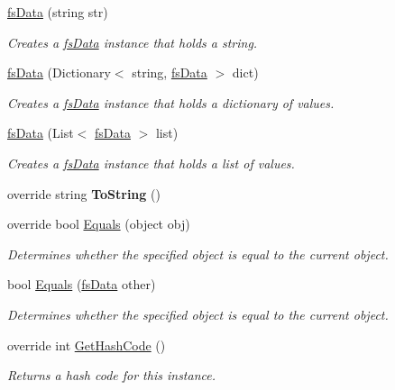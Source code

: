\begin{DoxyCompactItemize}
\hyperlink{class_full_serializer_1_1fs_data_a18d00eb27ffcbbd57ab7372856ae30f7}{fs\+Data} (string str)
\begin{DoxyCompactList}\small\item\em Creates a \hyperlink{class_full_serializer_1_1fs_data}{fs\+Data} instance that holds a string. \end{DoxyCompactList}\item 
\hyperlink{class_full_serializer_1_1fs_data_a8897bc4f6c2f0ff7acdcd0195746fc09}{fs\+Data} (Dictionary$<$ string, \hyperlink{class_full_serializer_1_1fs_data}{fs\+Data} $>$ dict)
\begin{DoxyCompactList}\small\item\em Creates a \hyperlink{class_full_serializer_1_1fs_data}{fs\+Data} instance that holds a dictionary of values. \end{DoxyCompactList}\item 
\hyperlink{class_full_serializer_1_1fs_data_af6e99c4d2e08a96957ccd44491026e92}{fs\+Data} (List$<$ \hyperlink{class_full_serializer_1_1fs_data}{fs\+Data} $>$ list)
\begin{DoxyCompactList}\small\item\em Creates a \hyperlink{class_full_serializer_1_1fs_data}{fs\+Data} instance that holds a list of values. \end{DoxyCompactList}\item 
\mbox{\label{class_full_serializer_1_1fs_data_ac64cd3d8fa914d376259ff913c208791}} 
override string {\bfseries To\+String} ()
\item 
override bool \hyperlink{class_full_serializer_1_1fs_data_a29d15c3ea23372768eea41226c322415}{Equals} (object obj)
\begin{DoxyCompactList}\small\item\em Determines whether the specified object is equal to the current object. \end{DoxyCompactList}\item 
bool \hyperlink{class_full_serializer_1_1fs_data_a31f0be7076e3aeea8051eef9b4bff6c3}{Equals} (\hyperlink{class_full_serializer_1_1fs_data}{fs\+Data} other)
\begin{DoxyCompactList}\small\item\em Determines whether the specified object is equal to the current object. \end{DoxyCompactList}\item 
override int \hyperlink{class_full_serializer_1_1fs_data_a915cae40a9014f6027c2b88e35d74e8c}{Get\+Hash\+Code} ()
\begin{DoxyCompactList}\small\item\em Returns a hash code for this instance. \end{DoxyCompactList}\end{DoxyCompactItemize}
